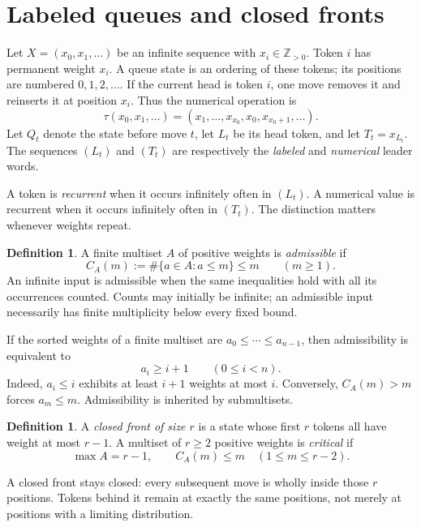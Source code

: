 \documentclass[11pt,letterpaper]{article}
\theoremstyle{definition}
\newtheorem{definition}[theorem]{Definition}
\newcommand{\Z}{\mathbb Z}
\begin{document}
\section{Labeled queues and closed fronts}\label{sec:model}
Let $X=(x_0,x_1,\ldots)$ be an infinite sequence with $x_i\in\Z_{>0}$.
Token $i$ has permanent weight $x_i$. A queue state is an ordering of these
tokens; its positions are numbered $0,1,2,\ldots$. If the current head is token
$i$, one move removes it and reinserts it at position $x_i$. Thus the numerical
operation is
\begin{equation}\label{eq:tau}
 \tau(x_0,x_1,\ldots)
   =(x_1,\ldots,x_{x_0},x_0,x_{x_0+1},\ldots).
\end{equation}
Let $Q_t$ denote the state before move $t$, let $L_t$ be its head token, and
let $T_t=x_{L_t}$. The sequences $(L_t)$ and $(T_t)$ are respectively the
\emph{labeled} and \emph{numerical} leader words.

A token is \emph{recurrent} when it occurs infinitely often in $(L_t)$. A
numerical value is recurrent when it occurs infinitely often in $(T_t)$.
The distinction matters whenever weights repeat.

\begin{definition}
A finite multiset $A$ of positive weights is \emph{admissible} if
\begin{equation}\label{eq:admissible}
 C_A(m):=\#\{a\in A:a\le m\}\le m\qquad(m\ge1).
\end{equation}
An infinite input is admissible when the same inequalities hold with all
its occurrences counted. Counts may initially be infinite; an admissible
input necessarily has finite multiplicity below every fixed bound.
\end{definition}
If the sorted weights of a finite multiset are
$a_0\le\cdots\le a_{n-1}$, then admissibility is equivalent to
\begin{equation}\label{eq:sorted-admissible}
 a_i\ge i+1\qquad(0\le i<n).
\end{equation}
Indeed, $a_i\le i$ exhibits at least $i+1$ weights at most $i$.
Conversely, $C_A(m)>m$ forces $a_m\le m$.
Admissibility is inherited by submultisets.

\begin{definition}
A \emph{closed front of size $r$} is a state whose first $r$ tokens all have
weight at most $r-1$. A multiset of $r\ge2$ positive weights is
\emph{critical} if
\begin{equation}\label{eq:critical}
 \max A=r-1,\qquad C_A(m)\le m\quad(1\le m\le r-2).
\end{equation}
\end{definition}
A closed front stays closed: every subsequent move is wholly inside those
$r$ positions. Tokens behind it remain at exactly the same positions, not
merely at positions with a limiting distribution.
\end{document}
